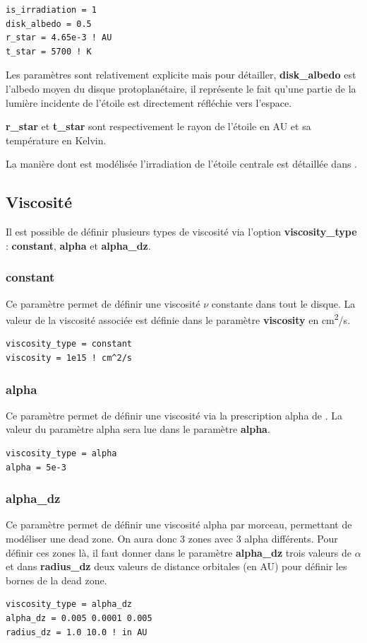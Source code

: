 \begin{verbatim}
is_irradiation = 1
disk_albedo = 0.5
r_star = 4.65e-3 ! AU
t_star = 5700 ! K
\end{verbatim}

Les paramètres sont relativement explicite mais pour détailler, \textbf{disk\_albedo} est l'albedo moyen du disque protoplanétaire, il représente le fait qu'une partie de la lumière incidente de l'étoile est directement réfléchie vers l'espace.

\textbf{r\_star} et \textbf{t\_star} sont respectivement le rayon de l'étoile en AU et sa température en Kelvin.

La manière dont est modélisée l'irradiation de l'étoile centrale est détaillée dans .

\subsection{Viscosité}
Il est possible de définir plusieurs types de viscosité via l'option \textbf{viscosity\_type} : \textbf{constant}, \textbf{alpha} et \textbf{alpha\_dz}.

\subsubsection{constant}
Ce paramètre permet de définir une viscosité $\nu$ constante dans tout le disque. La valeur de la viscosité associée est définie dans le paramètre \textbf{viscosity} en \unit{cm^2/s}.

\begin{verbatim}
viscosity_type = constant
viscosity = 1e15 ! cm^2/s
\end{verbatim}

\subsubsection{alpha}
Ce paramètre permet de définir une viscosité via la prescription alpha de \cite{shakura1973black}. La valeur du paramètre alpha sera lue dans le paramètre \textbf{alpha}. 

\begin{verbatim}
viscosity_type = alpha
alpha = 5e-3
\end{verbatim}

\subsubsection{alpha\_dz}
Ce paramètre permet de définir une viscosité alpha par morceau, permettant de modéliser une dead zone. On aura donc 3 zones avec 3 alpha différents. Pour définir ces zones là, il faut donner dans le paramètre \textbf{alpha\_dz} trois valeurs de $\alpha$ et dans \textbf{radius\_dz} deux valeurs de distance orbitales (en AU) pour définir les bornes de la dead zone.
\begin{verbatim}
viscosity_type = alpha_dz
alpha_dz = 0.005 0.0001 0.005
radius_dz = 1.0 10.0 ! in AU
\end{verbatim}

